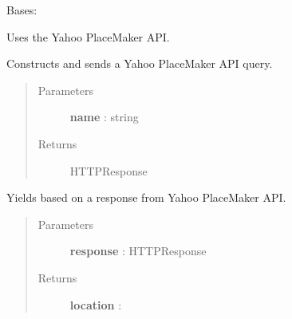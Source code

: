 \documentclass[letterpaper,10pt,english]{sphinxmanual}
\begin{document}
\begin{fulllineitems}
\label{tethne.services.geocode:tethne.services.geocode.YahooCoder}
Bases: {\hyperref[tethne.services.geocode:tethne.services.geocode.BaseCoder]{}}

Uses the Yahoo PlaceMaker API.

\begin{fulllineitems}
\label{tethne.services.geocode:tethne.services.geocode.YahooCoder.code}
Constructs and sends a Yahoo PlaceMaker API query.
\begin{quote}\begin{description}
\item[{Parameters}] \leavevmode
\textbf{name} : string

\item[{Returns}] \leavevmode
HTTPResponse

\end{description}\end{quote}

\end{fulllineitems}


\begin{fulllineitems}
\label{tethne.services.geocode:tethne.services.geocode.YahooCoder.get_location}
Yields {\hyperref[tethne.services.geocode:tethne.services.geocode.Location]{}} based on a response from Yahoo PlaceMaker API.
\begin{quote}\begin{description}
\item[{Parameters}] \leavevmode
\textbf{response} : HTTPResponse

\item[{Returns}] \leavevmode
\textbf{location} : {\hyperref[tethne.services.geocode:tethne.services.geocode.Location]{}}

\end{description}\end{quote}

\end{fulllineitems}


\end{fulllineitems}
\end{document}

